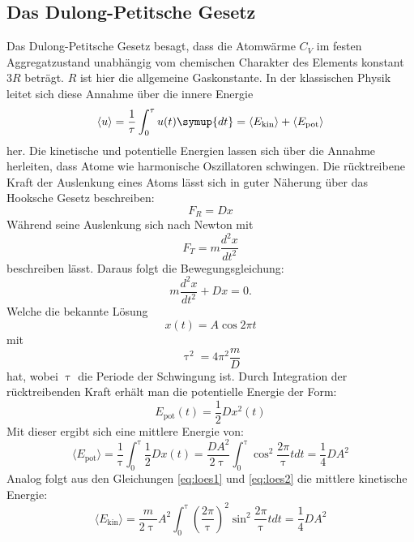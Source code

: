\subsection{Das Dulong-Petitsche Gesetz}
Das Dulong-Petitsche Gesetz besagt, dass die Atomwärme $C_V$ im festen Aggregatzustand
unabhängig vom chemischen Charakter des Elements konstant $3R$ beträgt.
$R$ ist hier die allgemeine Gaskonstante.
In der klassischen Physik leitet sich diese Annahme über die innere Energie
 \begin{equation}
 \langle u \rangle = \frac{1}{\tau} \int_0^\tau u(t)\symup{dt} = \langle E_\text{kin} \rangle + \langle
E_\text{pot} \rangle
 \end{equation}
her.
Die kinetische und potentielle Energien lassen sich über die Annahme herleiten, dass Atome
wie harmonische Oszillatoren schwingen.
Die rücktreibene Kraft der Auslenkung eines Atoms lässt sich in guter Näherung über das Hooksche Gesetz beschreiben:
\begin{equation}
  F_R= Dx
\end{equation}
Während seine Auslenkung sich nach Newton mit
\begin{equation}
  F_T=   m \frac{d^2 x}{dt^2}
\end{equation}
beschreiben lässt.
Daraus folgt die Bewegungsgleichung:
\begin{equation}
  m \frac{d^2 x}{dt^2}+Dx=0 .
\end{equation}
Welche die bekannte Lösung
\begin{equation}
  \label{eq:loes1}
  x(t)=A \cos{2\pi t}
\end{equation}
mit
\begin{equation}
  \label{eq:loes2}
  \uptau^2 = 4 \pi^2 \frac{m}{D}
\end{equation}
hat, wobei $\uptau$ die Periode der Schwingung ist.
Durch Integration der rücktreibenden Kraft erhält man die potentielle Energie der Form:
\begin{equation}
  E_\text{pot}(t) = \frac{1}{2}Dx^2(t)
\end{equation}
Mit dieser ergibt sich eine mittlere Energie von:
\begin{equation}
  \langle E_\text{pot} \rangle = \frac{1}{\uptau} \int_0^\uptau \frac{1}{2}Dx(t)=\frac{DA^2}{2\uptau}\int_0^\uptau \cos^2{\frac{2\pi}{\uptau}t}dt =\frac{1}{4}DA^2
\end{equation}
Analog folgt aus den Gleichungen \eqref{eq:loes1} und \eqref{eq:loes2} die mittlere kinetische Energie:
\begin{equation}
  \langle E_\text{kin} \rangle = \frac{m}{2\uptau} A^2 \int_0^\uptau (\frac{2\pi}{\uptau})^2 \sin^2{\frac{2\pi}{\uptau}t} dt = \frac{1}{4}DA^2
\end{equation}
